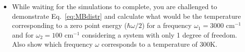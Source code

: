 \documentclass[a4paper,11pt]{scrartcl}
\begin{document}
\begin{itemize}
\begin{enumerate}
% 


% 
% 




\end{enumerate}

\item While waiting for the simulations to complete, you are challenged to demonstrate Eq.~\ref{eq:MBdistr} and calculate what would be the temperature 
corresponding to a zero point energy ($\hbar\omega/2$) for a frequency $\omega_1 = 3000$ cm$^{-1}$ and for $\omega_2 = 100$ cm$^{-1}$ considering a system with only 1 degree of freedom. 
Also show which frequency $\omega$ corresponds to a temperature of 300K.




\end{itemize}
\end{document}
